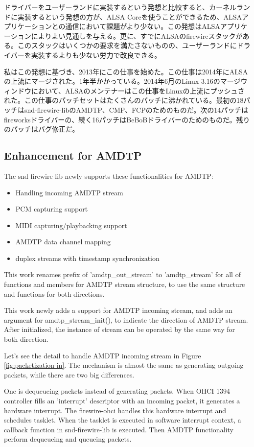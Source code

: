 \documentclass[onecolumn]{jarticle}
\begin{document}
ドライバーをユーザーランドに実装するという発想と比較すると、カーネルランドに実装するという発想の方が、ALSA Coreを使うことができるため、ALSAアプリケーションとの通信において課題がより少ない。この発想はALSAアプリケーションによりよい見通しを与える。更に、すでにALSAのfirewireスタックがある。このスタックはいくつかの要求を満たさないものの、ユーザーランドにドライバーを実装するよりも少ない労力で改良できる。

私はこの発想に基づき、2013年にこの仕事を始めた。この仕事は2014年にALSAの上流にマージされた。1年半かかっている。2014年6月のLinux 3.16のマージウィンドウにおいて、ALSAのメンテナーはこの仕事をLinuxの上流にプッシュされた。この仕事のパッチセットはたくさんのパッチに沸かれている。最初の18パッチはsnd-firewire-libのAMDTP、CMP、FCPのためのものだ。次の14パッチはfireworksドライバーの、続く16パッチはBeBoBドライバーのためのものだ。残りのパッチはバグ修正だ。

\subsection{Enhancement for AMDTP}

The snd-firewire-lib newly supports these functionalities for AMDTP:

\begin{itemize}
	\item Handling incoming AMDTP stream
	\item PCM capturing support
	\item MIDI capturing/playbacking support
	\item AMDTP data channel mapping
	\item duplex streams with timestamp synchronization
\end{itemize}

This work renames prefix of 'amdtp\_out\_stream' to 'amdtp\_stream' for all of functions and members for AMDTP stream structure, to use the same structure and functions for both directions.

This work newly adds a support for AMDTP incoming stream, and adds an argument for amdtp\_stream\_init(), to indicate the direction of AMDTP stream. After initialized, the instance of stream can be operated by the same way for both direction.

Let's see the detail to handle AMDTP incoming stream in Figure \ref{fig:packetization-in}. The mechanism is almost the same as generating outgoing packets, while there are two big differences.

One is dequeueing packets instead of generating packets. When OHCI 1394 controller fills an 'interrupt' descriptor with an incoming packet, it generates a hardware interrupt. The firewire-ohci handles this hardware interrupt and schedules tasklet. When the tasklet is executed in software interrupt context, a callback function in snd-firewire-lib is executed. Then AMDTP functionality perform dequeueing and queueing packets.
\end{document}

